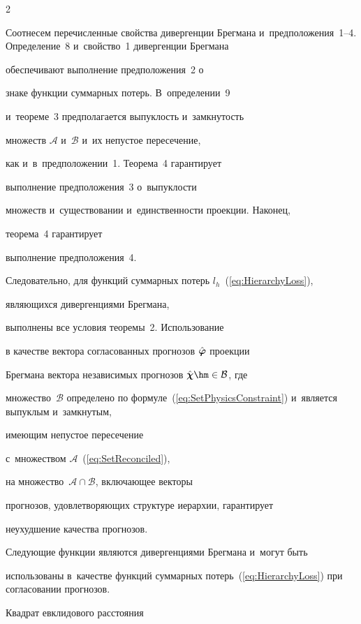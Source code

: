 \begin{multicols}{2}
\smallskip



Соотнесем перечисленные свойства дивергенции Брегмана и~предположения~1--4. Определение~8 и~свойство~1 дивергенции Брегмана

обеспечивают выполнение предположения~2 о

знаке функции суммарных потерь. В~определении~9

и~тео\-ре\-ме~3 предполагается выпуклость и~замкнутость

множеств $\mathcal{A}$ и~$\mathcal{B}$ и~их непустое пересечение,

как и~в~предположении~1. Теорема~4 гарантирует

выполнение предположения~3 о~выпуклости

множеств и~существовании и~единственности проекции. Наконец,

теорема~4 гарантирует

выполнение предположения~4.

Следовательно, для функций суммарных потерь $l_h$~(\ref{eq:HierarchyLoss}),

являющихся дивергенциями Брегмана,

выполнены все условия теоремы~2. Использование

в качестве вектора согласованных прогнозов $\hat{\boldsymbol{\varphi}}$ проекции

Брегмана вектора независимых прогнозов $\hchi \hm\in \mathcal{B}$, где

множество~$\mathcal{B}$ определено по формуле~(\ref{eq:SetPhysicsConstraint}) и~является выпуклым и~замкнутым,

имеющим непустое пересечение

с~множеством $\mathcal{A}$~(\ref{eq:SetReconciled}),

на множество~$\mathcal{A}\cap \mathcal{B}$, включающее векторы

прогнозов, удовлетворяющих структуре иерархии, гарантирует

неухудшение качества прогнозов.



Следующие функции являются дивергенциями Брегмана и~могут быть

использованы в~качестве функций суммарных потерь~(\ref{eq:HierarchyLoss}) при согласовании прогнозов.

\begin{description}

    \item[Квадрат евклидового расстояния] \




\end{description}
\end{multicols}
